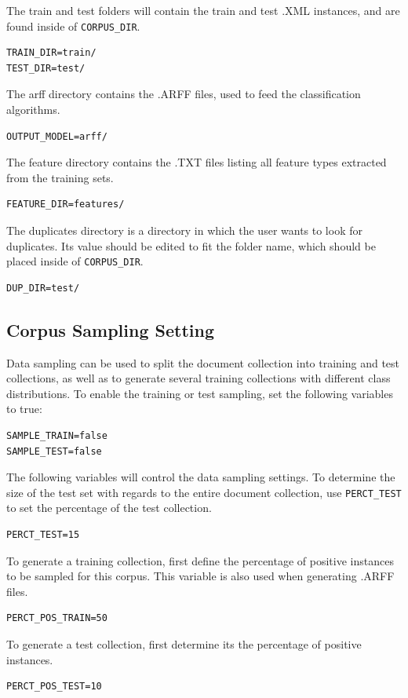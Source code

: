 \documentclass[11pt]{article}
\begin{document}
The train and test folders will contain the train and test .XML instances, and are found inside of \texttt{CORPUS\_DIR}.
\begin{lstlisting}
TRAIN_DIR=train/
TEST_DIR=test/
\end{lstlisting}

The arff directory contains the .ARFF files, used to feed the classification algorithms.
\begin{lstlisting}
OUTPUT_MODEL=arff/
\end{lstlisting}

The feature directory contains the .TXT files listing all feature types extracted from the training sets.
\begin{lstlisting}
FEATURE_DIR=features/
\end{lstlisting}

The duplicates directory is a directory in which the user wants to look for duplicates.
Its value should be edited to fit the folder name, which should be placed inside of \texttt{CORPUS\_DIR}.
\begin{lstlisting}
DUP_DIR=test/
\end{lstlisting}

\subsection{Corpus Sampling Setting}
\label{subsec:corpussamp}
Data sampling can be used to split the document collection into training and test collections, 
as well as to generate several training collections with different class distributions.
To enable the training or test sampling, set the following variables to true:
\begin{lstlisting}
SAMPLE_TRAIN=false
SAMPLE_TEST=false
\end{lstlisting}
The following variables will control the data sampling settings.
To determine the size of the test set with regards to the entire document collection, use \texttt{PERCT\_TEST} to set the percentage of the test collection.
\begin{lstlisting}
PERCT_TEST=15
\end{lstlisting}
To generate a training collection, first define the percentage of positive instances to be sampled for this corpus.
This variable is also used when generating .ARFF files. 
\begin{lstlisting}
PERCT_POS_TRAIN=50
\end{lstlisting}
To generate a test collection, first determine its the percentage of positive instances.
\begin{lstlisting}
PERCT_POS_TEST=10
\end{lstlisting}
\end{document}
